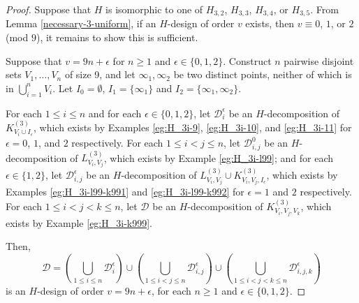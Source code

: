 \begin{proof}
Suppose that $H$ is isomorphic to one of $H_{3,2}$, $H_{3,3}$, $H_{3,4}$, or $H_{3,5}$.
From Lemma \ref{necessary-3-uniform}, if an $H$-design of order $v$ exists, then $v \equiv 0$, $1$, or $2$ (mod $9$), it remains to show this is sufficient.

Suppose that $v = 9n + \epsilon$ for $n \geq 1$ and $\epsilon \in \{0,1,2\}$.
Construct $n$ pairwise disjoint sets $V_1, \ldots, V_n$ of size 9,
and let $\infty_1, \infty_2$ be two distinct points, neither of which is in $\bigcup_{i=1}^{n} V_i$.
Let $I_0 = \emptyset$, $I_1 = \{\infty_1\}$ and $I_2 = \{\infty_1, \infty_2\}$.

For each $1 \leq i \leq n$ and for each $\epsilon \in \{0,1,2\}$, let $\mathcal{D}_i^{\epsilon}$ be an $H$-decomposition of $K_{V_i \cup I_\epsilon}^{(3)}$,
which exists by Examples \ref{eg:H_3i-9}, \ref{eg:H_3i-10}, and \ref{eg:H_3i-11} for $\epsilon = 0$, $1$, and $2$ respectively.
%
For each $1 \leq i < j \leq n$, let $\mathcal{D}_{i,j}^{0}$ be an $H$-decomposition of $L_{V_i, V_j}^{(3)}$, which exists by Example \ref{eg:H_3i-l99};
and for each $\epsilon \in \{1,2\}$, let $\mathcal{D}_{i,j}^{\epsilon}$ be an $H$-decomposition of $L_{V_i, V_j}^{(3)} \cup K_{V_i,V_j,I_\epsilon}^{(3)}$,
which exists by Examples \ref{eg:H_3i-l99-k991} and \ref{eg:H_3i-l99-k992} for $\epsilon = 1$ and $2$ respectively.
%
For each $1 \leq i < j < k \leq n$, let $\mathcal{D}$ be an $H$-decomposition of $K_{V_i,V_j,V_k}^{(3)}$, which exists by Example \ref{eg:H_3i-k999}.

Then,
\[
    \mathcal{D} = \left( \bigcup_{1 \leq i \leq n} \mathcal{D}_{i}^{\epsilon} \right)
    \cup \left( \bigcup_{1 \leq i < j \leq n} \mathcal{D}_{i,j}^{\epsilon} \right)
    \cup \left( \bigcup_{1 \leq i < j < k \leq n} \mathcal{D}_{i,j,k}^{\epsilon} \right)
\]
is an $H$-design of order $v = 9n + \epsilon$, for each $n \geq 1$ and $\epsilon \in \{0,1,2\}$.
\end{proof}


